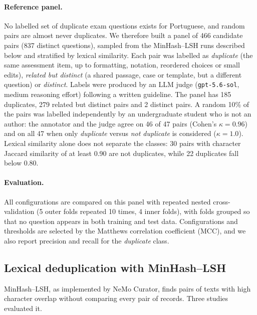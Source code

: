 \paragraph{Reference panel.} No labelled set of duplicate exam questions
exists for Portuguese, and random pairs are almost never duplicates. We
therefore built a panel of 466 candidate pairs (837 distinct questions),
sampled from the MinHash--LSH runs described below and stratified by lexical
similarity. Each pair was labelled as \emph{duplicate} (the same assessment
item, up to formatting, notation, reordered choices or small edits),
\emph{related but distinct} (a shared passage, case or template, but a
different question) or \emph{distinct}. Labels were produced by an LLM judge
(\texttt{gpt-5.6-sol}, medium reasoning effort) following a written
guideline. The panel has 185 duplicates, 279 related but distinct pairs and 2
distinct pairs. A random 10\% of the pairs was labelled independently by an
undergraduate student who is not an author: the annotator and the judge agree
on 46 of 47 pairs (Cohen's $\kappa=0.96$) and on all 47 when only
\emph{duplicate} versus \emph{not duplicate} is considered ($\kappa=1.0$).
Lexical similarity alone does not separate the classes: 30 pairs with
character Jaccard similarity of at least 0.90 are not duplicates, while 22
duplicates fall below 0.80.

\paragraph{Evaluation.} All configurations are compared on this panel with
repeated nested cross-validation (5 outer folds repeated 10 times, 4 inner
folds), with folds grouped so that no question appears in both training and
test data. Configurations and thresholds are selected by the Matthews
correlation coefficient (MCC), and we also report precision and recall for
the \emph{duplicate} class.

\subsection{Lexical deduplication with MinHash--LSH}
\label{app:dedup-short-lexical}

MinHash--LSH, as implemented by NeMo Curator, finds pairs of texts with high
character overlap without comparing every pair of records. Three studies
evaluated it.

